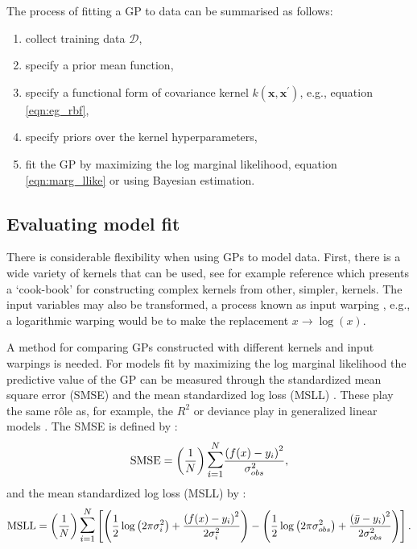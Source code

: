 The process of fitting a GP to data can be summarised as follows:
\begin{enumerate}
    \item collect training data $\mathcal{D}$, 
    \item specify a prior mean function, 
    \item  specify a functional form of covariance kernel $k(\mathbf{x}, \mathbf{x}^{\prime})$, e.g., equation \ref{eqn:eg_rbf}, 
    \item specify priors over the kernel hyperparameters, 
    \item fit the GP by maximizing the log marginal likelihood, equation \ref{eqn:marg_llike} or using Bayesian estimation. 
\end{enumerate}

\subsection{Evaluating model fit}\label{subsec:gp_fit}

There is considerable flexibility when using GPs to model data. First, there is a wide variety of kernels that can be used, see for example reference \cite{duvenaudAutomaticModelConstruction2014} which presents a `cook-book' for constructing complex kernels from other, simpler, kernels. The input variables may also be transformed, a process known as input warping \cite{snoekInputWarpingBayesian2014a}, e.g., a logarithmic warping would be to make the replacement $x \rightarrow \log{(x)}$. 

A method for comparing GPs constructed with different kernels and input warpings is needed. For models fit by maximizing the log marginal likelihood the predictive value of the GP can be measured through the standardized mean square error (SMSE) and the mean standardized log loss (MSLL) \cite{rasmussenGaussianProcessesMachine2006}. These play the same r\^ole as, for example, the $R^2$ or deviance play in generalized linear models \cite{dobson2018introduction}. The SMSE is defined by \cite{rasmussenGaussianProcessesMachine2006}:
\begin{equation}\label{eqn:smse}
\mathrm{SMSE} =\left(\frac{1}{N}\right) \mathlarger{\mathlarger{\sum}}_{i=1}^{N} \frac{\left(f(x)-y_{i}\right)^{2}}{\sigma_{obs}^{2}},
\end{equation}
and the mean standardized log loss (MSLL) by \cite{rasmussenGaussianProcessesMachine2006}:
\begin{equation}\label{eqn:msll}
\mathrm{MSLL}=\left(\frac{1}{N}\right) \mathlarger{\mathlarger{\sum}}_{i=1}^{N}\left[\left(\frac{1}{2} \log \left(2 \pi \sigma_{i}^{2}\right)+\frac{\left(f(x)-y_{i}\right)^{2}}{2\sigma_{i}^{2}}\right)-\left(\frac{1}{2} \log \left(2 \pi \sigma_{obs}^{2}\right)+\frac{\left(\bar{y}-y_{i}\right)^{2}}{2\sigma_{obs}^{2}}\right)\right].
\end{equation}  

